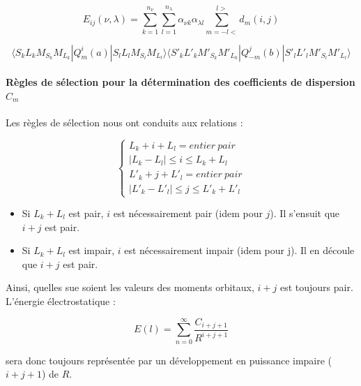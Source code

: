 	\begin{equation*}
	E_{ij}(\nu , \lambda)= \sum_{k=1}^{n_{\nu}} \sum_{l=1}^{n_{\lambda}} \alpha_{\nu k} \alpha_{\lambda l} \sum_{m=-l<}^{l>} d_{m}(i,j)
	\end{equation*}
	
	\begin{equation}
	\langle S_{k}L_{k}M_{S_{k}}M_{L_{k}}| Q_{m}^{i} (a)| S_{l}L_{l}M_{S_{l}}M_{L_{l}}\rangle \langle S'_{k}L'_{k}M'_{S_{k}}M'_{L_{k}}| Q_{-m}^{j} (b) | S'_{l}L'_{l}M'_{S_{l}}M'_{L_{l}}\rangle
	\end{equation}
	
	\paragraph{Règles de sélection pour la détermination des coefficients de dispersion $C_{m}$}
	
	Les règles de sélection nous ont conduits aux relations :
	
	\begin{equation}
	\begin{cases}
	L_{k} + i + L_{l} = entier\ pair \\
	|L_{k} - L_{l}| \leq i \leq L_{k} + L_{l} \\
	L'_{k} + j + L'_{l} = entier\ pair \\
	|L'_{k} - L'_{l}| \leq j \leq L'_{k} + L'_{l}
	\end{cases}
	\end{equation}
	
	\begin{itemize}
		\item Si $L_{k} + L_{l}$ est pair, $i$ est nécessairement pair (idem pour $j$). Il s'ensuit que $i + j$ est pair.	
		\item Si $L_{k} + L_{l}$ est impair, $i$ est nécessairement impair (idem pour j). Il en découle que $i + j$ est pair.
	\end{itemize}
	
	Ainsi, quelles sue soient les valeurs des moments orbitaux, $i + j$ est toujours pair. L'énergie électrostatique : 
	
	\begin{equation}
	E(l) = \sum_{n=0}^{\infty} \frac{C_{i+j+1}}{R^{i+j+1}}
	\end{equation}
	
	sera donc toujours représentée par un développement en puissance impaire ($i+ j + 1$) de $R$.
	
